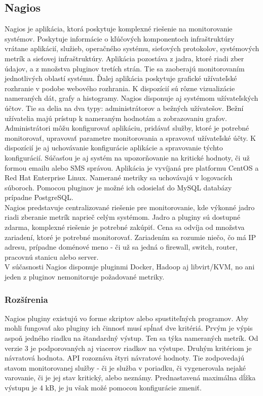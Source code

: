\documentclass[12pt,twoside,color,cover,table]{fithesis3}
\begin{document}
\subsection{Nagios}
Nagios je aplikácia, ktorá poskytuje komplexné riešenie na monitorovanie systémov. Poskytuje informácie o kľúčových komponentoch infraštruktúry vrátane aplikácií, služieb, operačného systému, sieťových protokolov, systémových metrík
a sieťovej infraštruktúry. %
Aplikácia pozostáva z jadra, ktoré riadi zber údajov, a z množstva pluginov tretích strán. Tie sa zaoberajú monitorovaním jednotlivých oblastí systému. Ďalej aplikácia
poskytuje grafické užívateľské rozhranie v podobe webového rozhrania. K dispozícií sú rôzne vizualizácie nameraných dát, grafy a histogramy. Nagios disponuje aj systémom užívateľských účtov. Tie sa delia na dva typy: 
administrátorov a bežných užívatešov. Bežní užívatelia majú prístup k nameraným hodnotám a zobrazovaniu grafov. Administrátori môžu konfigurovať aplikáciu, pridávať služby, ktoré je potrebné monitorovať,
upravovať parametre monitorovania a spravovať užívateľské účty. K dispozícií je aj uchovávanie konfigurácie aplikácie a spravovanie týchto konfigurácií. Súčasťou je aj systém na upozorňovanie na kritické
hodnoty, či už formou emailu alebo SMS správou. Aplikácia je vyvíjaná pre platformu CentOS a Red Hat Enterprise Linux. Namerané metriky sa uchovávajú v logovacích súboroch. 
Pomocou pluginov je možné ich odosielať do MySQL databázy prípadne PostgreSQL. 
\\Nagios predstavuje centralizované riešenie pre  monitorovanie, kde výkonné jadro riadi zberanie metrík naprieč celým systémom. 
Jadro a pluginy sú dostupné zdarma, komplexné riešenie je potrebné zakúpiť. Cena sa odvíja od množstva zariadení, ktoré je potrebné monitorovať. Zariadením sa rozumie niečo, čo má IP adresu, 
prípadne doménové meno - či už sa jedná o firewall, switch, router, pracovnú stanicu alebo server. 
\\V súčasnosti Nagios disponuje pluginmi Docker, Hadoop aj libvirt/KVM, no ani jeden z pluginov nemonitoruje požadované metriky.

\subsubsection{Rozšírenia}
Nagios pluginy existujú vo forme skriptov alebo spustiteľných programov. Aby mohli fungovať ako pluginy ich činnosť musí spĺnať dve kritériá. Prvým je výpis aspoň jedného riadku na štandardný výstup.
Ten sa týka nameraných metrík. Od verzie 3 je podporovaných aj viacerov riadkov na výstupe. Druhým kritériom je návratová hodnota.
API rozoznáva štyri návratové hodnoty. Tie zodpovedajú stavom monitorovanej služby - či je služba v poriadku, či vygenerovala nejaké varovanie, či je jej stav kritický, alebo neznámy. Prednastavená maximálna dĺžka 
výstupu je 4 kB, je ju však možé pomocou konfigurácie zmeniť.
\end{document}
